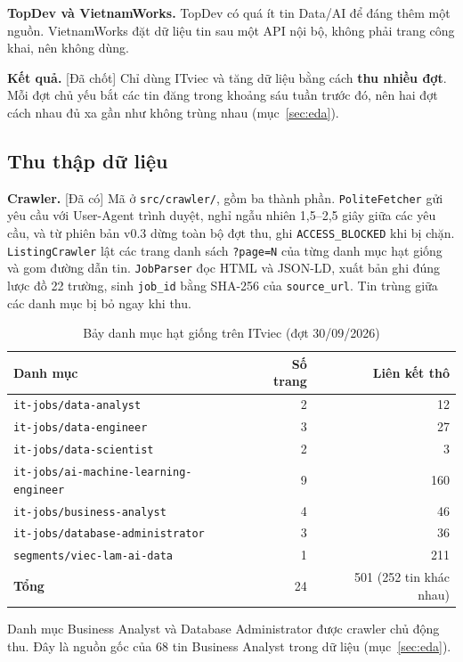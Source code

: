 \documentclass[12pt]{article}
\newcommand{\code}[1]{\texttt{#1}}
\newcommand{\dacoi}{\textsf{[Đã có]}}
\newcommand{\dachot}{\textsf{[Đã chốt]}}
\begin{document}
\textbf{TopDev và VietnamWorks.} TopDev có quá ít tin Data/AI để đáng thêm một nguồn. VietnamWorks đặt dữ liệu tin sau một API nội bộ, không phải trang công khai, nên không dùng.

\textbf{Kết quả.} \dachot{} Chỉ dùng ITviec và tăng dữ liệu bằng cách \textbf{thu nhiều đợt}. Mỗi đợt chủ yếu bắt các tin đăng trong khoảng sáu tuần trước đó, nên hai đợt cách nhau đủ xa gần như không trùng nhau (mục~\ref{sec:eda}).

\subsection{Thu thập dữ liệu}
\label{sec:collection}

\textbf{Crawler.} \dacoi{} Mã ở \code{src/crawler/}, gồm ba thành phần. \code{PoliteFetcher} gửi yêu cầu với User-Agent trình duyệt, nghỉ ngẫu nhiên 1,5--2,5 giây giữa các yêu cầu, và từ phiên bản v0.3 dừng toàn bộ đợt thu, ghi \code{ACCESS\_BLOCKED} khi bị chặn. \code{ListingCrawler} lật các trang danh sách \code{?page=N} của từng danh mục hạt giống và gom đường dẫn tin. \code{JobParser} đọc HTML và JSON-LD, xuất bản ghi đúng lược đồ 22 trường, sinh \code{job\_id} bằng SHA-256 của \code{source\_url}. Tin trùng giữa các danh mục bị bỏ ngay khi thu.

\begin{table}[htbp]
\centering
\caption{Bảy danh mục hạt giống trên ITviec (đợt 30/09/2026)}
\label{tab:seeds}
\renewcommand{\arraystretch}{1.15}
\begin{tabular}{l r r}
\toprule
\textbf{Danh mục} & \textbf{Số trang} & \textbf{Liên kết thô} \\
\midrule
\code{it-jobs/data-analyst} & 2 & 12 \\
\code{it-jobs/data-engineer} & 3 & 27 \\
\code{it-jobs/data-scientist} & 2 & 3 \\
\code{it-jobs/ai-machine-learning-engineer} & 9 & 160 \\
\code{it-jobs/business-analyst} & 4 & 46 \\
\code{it-jobs/database-administrator} & 3 & 36 \\
\code{segments/viec-lam-ai-data} & 1 & 211 \\
\midrule
\textbf{Tổng} & 24 & 501 (252 tin khác nhau) \\
\bottomrule
\end{tabular}
\end{table}

Danh mục Business Analyst và Database Administrator được crawler chủ động thu. Đây là nguồn gốc của 68 tin Business Analyst trong dữ liệu (mục~\ref{sec:eda}).
\end{document}
